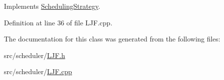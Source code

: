 Implements \hyperlink{class_scheduling_strategy_a62ffa0426528c14fdd0b0853f04a851f}{Scheduling\+Strategy}.



Definition at line 36 of file L\+J\+F.\+cpp.



The documentation for this class was generated from the following files\+:\begin{DoxyCompactItemize}
\item 
src/scheduler/\hyperlink{_l_j_f_8h}{L\+J\+F.\+h}\item 
src/scheduler/\hyperlink{_l_j_f_8cpp}{L\+J\+F.\+cpp}\end{DoxyCompactItemize}
